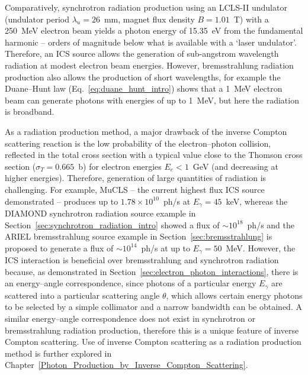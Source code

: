 \documentclass[../main.tex]{subfiles}
\begin{document}
Comparatively, synchrotron radiation production using an LCLS-II undulator (undulator period $\lambda_{u} = 26$~\si{\milli\meter}, magnet flux density $B = 1.01$~\si{\tesla}) \cite{wallen2016status} with a 250~\si{\mega\electronvolt} electron beam yields a photon energy of 15.35~\si{\electronvolt} from the fundamental harmonic -- orders of magnitude below what is available with a `laser undulator'. Therefore, an ICS source allows the generation of sub-angstrom wavelength radiation at modest electron beam energies. However, bremsstrahlung radiation production also allows the production of short wavelengths, for example the Duane--Hunt law (Eq.~\ref{eq:duane_hunt_intro}) shows that a 1~\si{\mega\electronvolt} electron beam can generate photons with energies of up to 1~\si{\mega\electronvolt}, but here the radiation is broadband.

As a radiation production method, a major drawback of the inverse Compton scattering reaction is the low probability of the electron--photon collision, reflected in the total cross section with a typical value close to the Thomson cross section ($\sigma_{T} = 0.665$~\si{\barn}) for electron energies $E_{e} < 1$~\si{\giga\electronvolt} (and decreasing at higher energies). Therefore, generation of large quantities of radiation is challenging. For example, MuCLS -- the current highest flux ICS source demonstrated -- produces up to $1.78\times 10^{10}$~ph/\si{\second} \cite{eggl2016munich} at $E_{\gamma} = 45$~\si{\kilo\electronvolt}, whereas the DIAMOND synchrotron radiation source example in Section~\ref{sec:synchrotron_radiation_intro} showed a flux of $\sim 10^{18}$~ph/\si{\second} and the ARIEL bremsstrahlung source example in Section~\ref{sec:bremsstrahlung} is proposed to generate a flux of $\sim 10^{14}$~ph/\si{\second} at up to $E_{\gamma} = 50$~\si{\mega\electronvolt}. However, the ICS interaction is beneficial over bremsstrahlung and synchrotron radiation because, as demonstrated in Section~\ref{sec:electron_photon_interactions}, there is an energy--angle correspondence, since photons of a particular energy $E_{\gamma}$ are scattered into a particular scattering angle $\theta$, which allows certain energy photons to be selected by a simple collimator and a narrow bandwidth can be obtained. A similar energy--angle correspondence does not exist in synchrotron or bremsstrahlung radiation production, therefore this is a unique feature of inverse Compton scattering. Use of inverse Compton scattering as a radiation production method is further explored in Chapter~\ref{Photon_Production_by_Inverse_Compton_Scattering}. 
\end{document}
